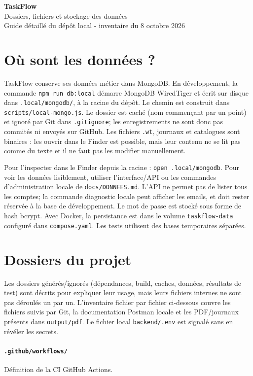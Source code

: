 \documentclass[10pt,a4paper]{article}
\begin{document}
{\Huge\bfseries\textcolor{forest}{TaskFlow}}\\[0.25em]
{\Large Dossiers, fichiers et stockage des données}\\
\textcolor{muted}{Guide détaillé du dépôt local - inventaire du 8 octobre 2026}
\section*{Où sont les données ?}
TaskFlow conserve ses données métier dans MongoDB. En développement, la commande \texttt{npm run db:local} démarre MongoDB WiredTiger et écrit sur disque dans \texttt{.local/mongodb/}, à la racine du dépôt. Le chemin est construit dans \texttt{scripts/local-mongo.js}. Le dossier est caché (nom commençant par un point) et ignoré par Git dans \texttt{.gitignore}; les enregistrements ne sont donc pas commités ni envoyés sur GitHub. Les fichiers \texttt{.wt}, journaux et catalogues sont binaires : les ouvrir dans le Finder est possible, mais leur contenu ne se lit pas comme du texte et il ne faut pas les modifier manuellement.

Pour l'inspecter dans le Finder depuis la racine : \texttt{open .local/mongodb}. Pour voir les données lisiblement, utiliser l'interface/API ou les commandes d'administration locale de \texttt{docs/DONNEES.md}. L'API ne permet pas de lister tous les comptes; la commande diagnostic locale peut afficher les emails, et doit rester réservée à la base de développement. Le mot de passe est stocké sous forme de hash bcrypt. Avec Docker, la persistance est dans le volume \texttt{taskflow-data} configuré dans \texttt{compose.yaml}. Les tests utilisent des bases temporaires séparées.

\section*{Dossiers du projet}
Les dossiers générés/ignorés (dépendances, build, caches, données, résultats de test) sont décrits pour expliquer leur usage, mais leurs fichiers internes ne sont pas déroulés un par un. L'inventaire fichier par fichier ci-dessous couvre les fichiers suivis par Git, la documentation Postman locale et les PDF/journaux présents dans \texttt{output/pdf}. Le fichier local \texttt{backend/.env} est signalé sans en révéler les secrets.
\paragraph{\texttt{.github/workflows/}} Définition de la CI GitHub Actions.
\end{document}
